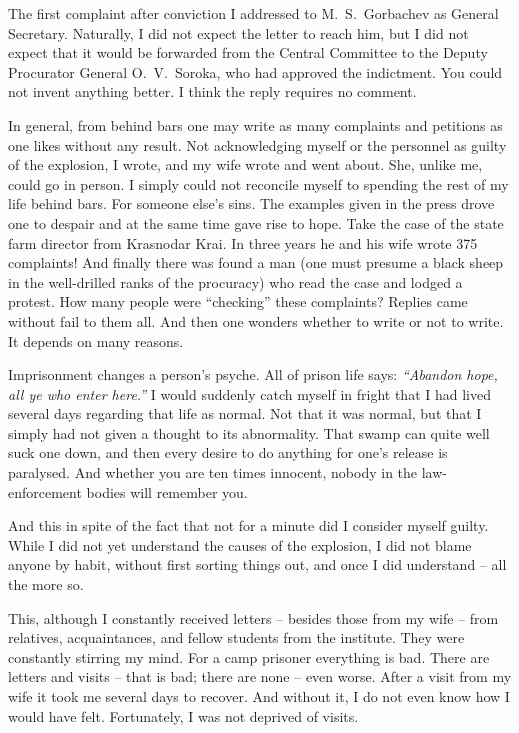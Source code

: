 \documentclass[openright]{bookest}
\begin{document}
The first complaint after conviction I addressed to M.~S.~Gorbachev as General Secretary. Naturally, I did not expect the letter to reach him, but I did not expect that it would be forwarded from the Central Committee to the Deputy Procurator General O.~V.~Soroka, who had approved the indictment. You could not invent anything better. I think the reply requires no comment.

In general, from behind bars one may write as many complaints and petitions as one likes without any result. Not acknowledging myself or the personnel as guilty of the explosion, I wrote, and my wife wrote and went about. She, unlike me, could go in person. I simply could not reconcile myself to spending the rest of my life behind bars. For someone else's sins. The examples given in the press drove one to despair and at the same time gave rise to hope. Take the case of the state farm director from Krasnodar Krai. In three years he and his wife wrote \num{375} complaints! And finally there was found a man (one must presume a black sheep in the well-drilled ranks of the procuracy) who read the case and lodged a protest. How many people were ``checking'' these complaints? Replies came without fail to them all. And then one wonders whether to write or not to write. It depends on many reasons.

Imprisonment changes a person's psyche. All of prison life says: \textit{``Abandon hope, all ye who enter here.''} I would suddenly catch myself in fright that I had lived several days regarding that life as normal. Not that it was normal, but that I simply had not given a thought to its abnormality. That swamp can quite well suck one down, and then every desire to do anything for one's release is paralysed. And whether you are ten times innocent, nobody in the law-enforcement bodies will remember you.

And this in spite of the fact that not for a minute did I consider myself guilty. While I did not yet understand the causes of the explosion, I did not blame anyone by habit, without first sorting things out, and once I did understand -- all the more so.

This, although I constantly received letters -- besides those from my wife -- from relatives, acquaintances, and fellow students from the institute. They were constantly stirring my mind. For a camp prisoner everything is bad. There are letters and visits -- that is bad; there are none -- even worse. After a visit from my wife it took me several days to recover. And without it, I do not even know how I would have felt. Fortunately, I was not deprived of visits.
\end{document}

